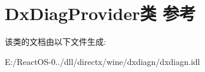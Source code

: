 \hypertarget{class_dx_diag_provider}{}\section{Dx\+Diag\+Provider类 参考}
\label{class_dx_diag_provider}


该类的文档由以下文件生成\+:\begin{DoxyCompactItemize}
\item 
E\+:/\+React\+O\+S-\/0../dll/directx/wine/dxdiagn/dxdiagn.\+idl\end{DoxyCompactItemize}
